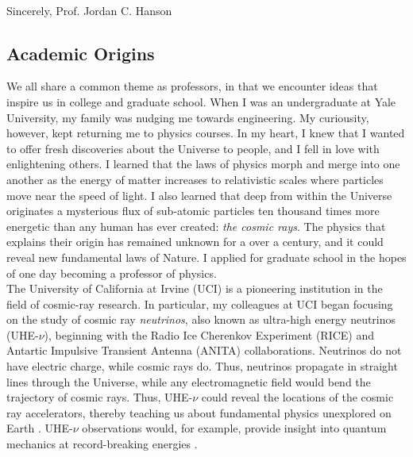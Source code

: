 \documentclass[../../main.tex]{subfiles}
\begin{document}
\\
\vspace{0.25cm}
Sincerely,
Prof. Jordan C. Hanson

\subsection{Academic Origins}
\label{sec:origin}

We all share a common theme as professors, in that we encounter ideas that inspire us in college and graduate school.  When I was an undergraduate at Yale University, my family was nudging me towards engineering.  My curiousity, however, kept returning me to physics courses.  In my heart, I knew that I wanted to offer fresh discoveries about the Universe to people, and I fell in love with enlightening others.  I learned that the laws of physics morph and merge into one another as the energy of matter increases to relativistic scales where particles move near the speed of light.  I also learned that deep from within the Universe originates a mysterious flux of sub-atomic particles ten thousand times more energetic than any human has ever created: \textit{the cosmic rays}.  The physics that explains their origin has remained unknown for a over a century, and it could reveal new fundamental laws of Nature.  I applied for graduate school in the hopes of one day becoming a professor of physics.
\\
\vspace{0.25cm}
The University of California at Irvine (UCI) is a pioneering institution in the field of cosmic-ray research.  In particular, my colleagues at UCI began focusing on the study of cosmic ray \textit{neutrinos}, also known as ultra-high energy neutrinos (UHE-$\nu$), beginning with the Radio Ice Cherenkov Experiment (RICE) \cite{PhysRevD.85.062004} and Antartic Impulsive Transient Antenna (ANITA) \cite{PhysRevD.99.122001} collaborations. Neutrinos do not have electric charge, while cosmic rays do.  Thus, neutrinos propagate in straight lines through the Universe, while any electromagnetic field would bend the trajectory of cosmic rays.  Thus, UHE-$\nu$ could reveal the locations of the cosmic ray accelerators, thereby teaching us about fundamental physics unexplored on Earth \cite{Astro2020_1} \cite{Astro2020_2}.  UHE-$\nu$ observations would, for example, provide insight into quantum mechanics at record-breaking energies \cite{PhysRevD.83.113009}.
\\
\vspace{0.25cm}
\end{document}

